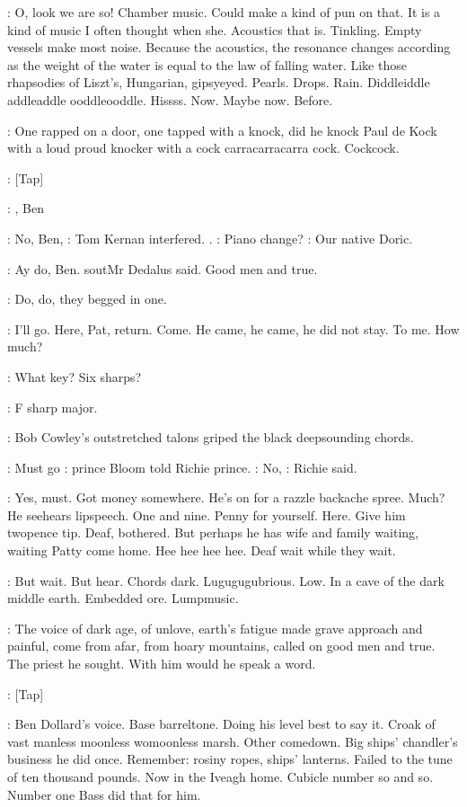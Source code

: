 \BloomInt:
O, look we are so! Chamber music. Could make a kind of pun on
that.
It is a kind of music I often thought when she. Acoustics that is.
Tinkling. Empty vessels make most noise. Because the acoustics, the
resonance changes according as the weight of the water is equal to the law
of falling water. Like those rhapsodies of Liszt's, Hungarian, gipsyeyed.
Pearls. Drops. Rain. Diddleiddle addleaddle ooddleooddle. Hissss. Now.
Maybe now. Before.

\BloomInt:
One rapped on a door, one tapped with a knock, did he knock Paul
de Kock with a loud proud knocker with a cock carracarracarra cock.
Cockcock.

\Stripling:
[Tap]

\Cowley:
, Ben

\Kernan:
No, Ben,
:
Tom Kernan interfered.
.
\Stage:
Piano change?
\Kernan:
Our native Doric.

\Simon:
Ay do, Ben.
sout{Mr Dedalus said.}
Good men and true.

:
Do, do, they begged in one.

\BloomInt:
I'll go. Here, Pat, return. Come.
He came, he came, he did not stay.
To me. How much?

\Cowley:
What key? Six sharps?

\Dollard:
F sharp major.

:
Bob Cowley's outstretched talons griped the
black deepsounding chords.

\BloomInt:
Must go
:
prince Bloom told Richie prince.
\Goulding:
No,
:
Richie said.

\BloomInt:
Yes, must.
Got money somewhere. He's on for a razzle backache spree. Much? He
seehears lipspeech. One and nine. Penny for yourself. Here. Give him
twopence tip. Deaf, bothered. But perhaps he has wife and family waiting,
waiting Patty come home. Hee hee hee hee. Deaf wait while they wait.

\BloomInt:
But wait. But hear. Chords dark. Lugugugubrious. Low. In a cave of
the dark middle earth. Embedded ore. Lumpmusic.

:
The voice of dark age, of unlove, earth's fatigue made grave approach
and painful, come from afar, from hoary mountains, called on good men
and true. The priest he sought. With him would he speak a word.

\Stripling:
[Tap]

\BloomInt:
Ben Dollard's voice. Base barreltone. Doing his level best to say it.
Croak of vast manless moonless womoonless marsh. Other comedown. Big
ships' chandler's business he did once. Remember: rosiny ropes, ships'
lanterns. Failed to the tune of ten thousand pounds. Now in the Iveagh
home. Cubicle number so and so. Number one Bass did that for him.

